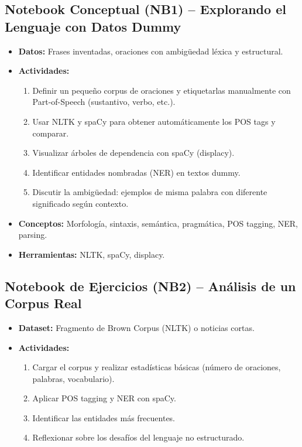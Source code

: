 \documentclass[12pt,a4paper]{article}
\begin{document}
\subsection*{Notebook Conceptual (NB1) – Explorando el Lenguaje con Datos Dummy}
\begin{itemize}
    \item \textbf{Datos:} Frases inventadas, oraciones con ambigüedad léxica y estructural.
    \item \textbf{Actividades:}
    \begin{enumerate}
        \item Definir un pequeño corpus de oraciones y etiquetarlas manualmente con Part-of-Speech (sustantivo, verbo, etc.).
        \item Usar NLTK y spaCy para obtener automáticamente los POS tags y comparar.
        \item Visualizar árboles de dependencia con spaCy (displacy).
        \item Identificar entidades nombradas (NER) en textos dummy.
        \item Discutir la ambigüedad: ejemplos de misma palabra con diferente significado según contexto.
    \end{enumerate}
    \item \textbf{Conceptos:} Morfología, sintaxis, semántica, pragmática, POS tagging, NER, parsing.
    \item \textbf{Herramientas:} NLTK, spaCy, displacy.
\end{itemize}

\subsection*{Notebook de Ejercicios (NB2) – Análisis de un Corpus Real}
\begin{itemize}
    \item \textbf{Dataset:} Fragmento de Brown Corpus (NLTK) o noticias cortas.
    \item \textbf{Actividades:}
    \begin{enumerate}
        \item Cargar el corpus y realizar estadísticas básicas (número de oraciones, palabras, vocabulario).
        \item Aplicar POS tagging y NER con spaCy.
        \item Identificar las entidades más frecuentes.
        \item Reflexionar sobre los desafíos del lenguaje no estructurado.
    \end{enumerate}
\end{itemize}
\end{document}
